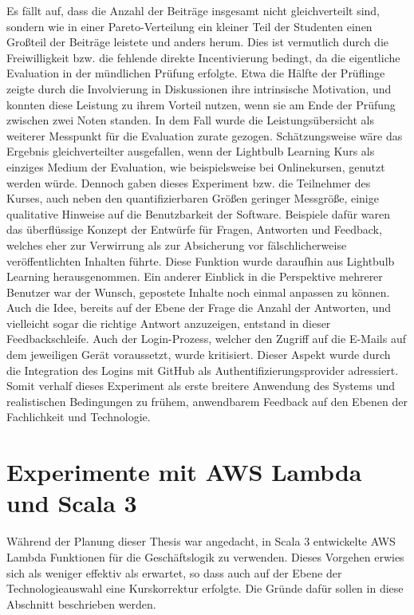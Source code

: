 \noindent Es fällt auf, dass die Anzahl der Beiträge insgesamt nicht gleichverteilt sind, sondern wie in einer Pareto-Verteilung ein kleiner Teil der Studenten einen Großteil der Beiträge leistete und anders herum. Dies ist vermutlich durch die Freiwilligkeit bzw. die fehlende direkte Incentivierung bedingt, da die eigentliche Evaluation in der mündlichen Prüfung erfolgte. Etwa die Hälfte der Prüflinge zeigte durch die Involvierung in Diskussionen ihre intrinsische Motivation, und konnten diese Leistung zu ihrem Vorteil nutzen, wenn sie am Ende der Prüfung zwischen zwei Noten standen. In dem Fall wurde die Leistungsübersicht als weiterer Messpunkt für die Evaluation zurate gezogen. Schätzungsweise wäre das Ergebnis gleichverteilter ausgefallen, wenn der Lightbulb Learning Kurs als einziges Medium der Evaluation, wie beispielsweise bei Onlinekursen, genutzt werden würde. Dennoch gaben dieses Experiment bzw. die Teilnehmer des Kurses, auch neben den quantifizierbaren Größen geringer Messgröße, einige qualitative Hinweise auf die Benutzbarkeit der Software. Beispiele dafür waren das überflüssige Konzept der Entwürfe für Fragen, Antworten und Feedback, welches eher zur Verwirrung als zur Absicherung vor fälschlicherweise veröffentlichten Inhalten führte. Diese Funktion wurde daraufhin aus Lightbulb Learning herausgenommen. Ein anderer Einblick in die Perspektive mehrerer Benutzer war der Wunsch, gepostete Inhalte noch einmal anpassen zu können. Auch die Idee, bereits auf der Ebene der Frage die Anzahl der Antworten, und vielleicht sogar die richtige Antwort anzuzeigen, entstand in dieser Feedbackschleife. Auch der Login-Prozess, welcher den Zugriff auf die E-Mails auf dem jeweiligen Gerät voraussetzt, wurde kritisiert. Dieser Aspekt wurde durch die Integration des Logins mit GitHub als Authentifizierungsprovider adressiert. Somit verhalf dieses Experiment als erste breitere Anwendung des Systems und realistischen Bedingungen zu frühem, anwendbarem Feedback auf den Ebenen der Fachlichkeit und Technologie.

\section{Experimente mit AWS Lambda und Scala 3}
Während der Planung dieser Thesis war angedacht, in Scala 3 entwickelte AWS Lambda Funktionen für die Geschäftslogik zu verwenden. Dieses Vorgehen erwies sich als weniger effektiv als erwartet, so dass auch auf der Ebene der Technologieauswahl eine Kurskorrektur erfolgte. Die Gründe dafür sollen in diese Abschnitt beschrieben werden.
